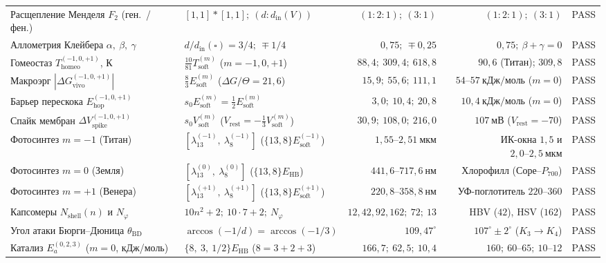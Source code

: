 \begin{table}[htbp]
\begin{tabular}{@{}llrrr@{}}
Расщепление Менделя $F_2$ (ген.\ / фен.) & $[1,1]*[1,1];\ (d : d_{\mathrm{in}}(V))$ & $(1:2:1);\ (3:1)$ & $(1:2:1);\ (3:1)$ & PASS \\
Аллометрия Клейбера $\alpha,\ \beta,\ \gamma$ & $d/d_{\mathrm{in}}(\square) = 3/4;\ \mp 1/4$ & $0{,}75;\ \mp 0{,}25$ & $0{,}75;\ \beta+\gamma=0$ & PASS \\
Гомеостаз $T_{\mathrm{homeo}}^{(-1,0,+1)}$, К & $\frac{10}{81}T_{\mathrm{soft}}^{(m)}$ ($m=-1,0,+1$) & $88{,}4;\ 309{,}4;\ 618{,}8$ & $90{,}6$ (Титан); $309{,}8$ & PASS \\
Макроэрг $|\Delta G_{\mathrm{vivo}}^{(-1,0,+1)}|$ & $\frac{8}{3}E_{\mathrm{soft}}^{(m)}$ ($\Delta G/\Theta = 21{,}6$) & $15{,}9;\ 55{,}6;\ 111{,}1$ & $54\text{--}57\ \text{кДж/моль}$ ($m=0$) & PASS \\
Барьер перескока $E_{\mathrm{hop}}^{(-1,0,+1)}$ & $s_0 E_{\mathrm{soft}}^{(m)} = \frac{1}{2}E_{\mathrm{soft}}^{(m)}$ & $3{,}0;\ 10{,}4;\ 20{,}8$ & $10{,}4\ \text{кДж/моль}$ ($m=0$) & PASS \\
Спайк мембран $\Delta V_{\mathrm{spike}}^{(-1,0,+1)}$ & $s_0 V_{\mathrm{soft}}^{(m)}$ ($V_{\mathrm{rest}} = -\frac{1}{3}V_{\mathrm{soft}}^{(m)}$) & $30{,}9;\ 108{,}0;\ 216{,}0$ & $107\ \text{мВ}$ ($V_{\mathrm{rest}}=-70$) & PASS \\
Фотосинтез $m=-1$ (Титан) & $[\lambda_{13}^{(-1)},\ \lambda_8^{(-1)}]$ ($\{13,8\}E_{\mathrm{soft}}^{(-1)}$) & $1{,}55\text{--}2{,}51\ \text{мкм}$ & ИК-окна $1{,}5$ и $2{,}0\text{--}2{,}5\ \text{мкм}$ & PASS \\
Фотосинтез $m=0$ (Земля) & $[\lambda_{13}^{(0)},\ \lambda_8^{(0)}]$ ($\{13,8\}E_{\mathrm{HB}}$) & $441{,}6\text{--}717{,}6\ \text{нм}$ & Хлорофилл (Соре--$P_{700}$) & PASS \\
Фотосинтез $m=+1$ (Венера) & $[\lambda_{13}^{(+1)},\ \lambda_8^{(+1)}]$ ($\{13,8\}E_{\mathrm{soft}}^{(+1)}$) & $220{,}8\text{--}358{,}8\ \text{нм}$ & УФ-поглотитель $220\text{--}360$ & PASS \\
Капсомеры $N_{\mathrm{shell}}(n)$ и $N_\varphi$ & $10n^2+2;\ 10\cdot 7+2;\ N_\varphi$ & $12,42,92,162;\ 72;\ 13$ & HBV ($42$), HSV ($162$) & PASS \\
Угол атаки Бюрги--Дюница $\theta_{\mathrm{BD}}$ & $\arccos(-1/d) = \arccos(-1/3)$ & $109{,}47^\circ$ & $107^\circ \pm 2^\circ$ ($K_3\to K_4$) & PASS \\
Катализ $E_a^{(0,2,3)}$ ($m=0$, кДж/моль) & $\{8,\ 3,\ 1/2\}E_{\mathrm{HB}}$ ($8=3+2+3$) & $166{,}7;\ 62{,}5;\ 10{,}4$ & $160;\ 60\text{--}65;\ 10\text{--}12$ & PASS \\

\end{tabular}
\end{table}
